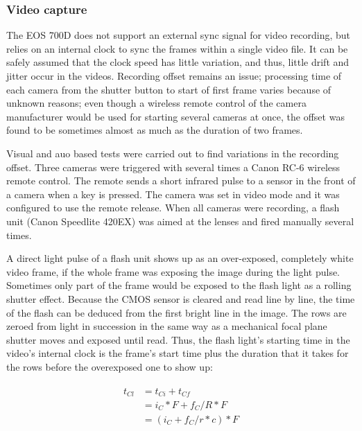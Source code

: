 \subsubsection{Video capture}


The EOS 700D does not support an external sync signal for video recording, but relies on an internal clock to sync the frames within a single video file.
It can be safely assumed that the clock speed has little variation, and thus, little drift and jitter occur in the videos.
Recording offset remains an issue;
processing time of each camera from the shutter button to start of first frame varies because of unknown reasons; even though a wireless remote control of the camera manufacturer would be used for starting several cameras at once, the offset was found to be sometimes almost as much as the duration of two frames.


Visual and auo based tests were carried out to find variations in the recording offset.
Three cameras were triggered with several times a Canon RC-6 wireless remote control.
The remote sends a short infrared pulse to a sensor in the front of a camera when a key is pressed.
The camera was set in video mode and it was configured to use the remote release.
When all cameras were recording, a flash unit (Canon Speedlite 420EX) was aimed at the lenses and fired manually several times.


A direct light pulse of a flash unit shows up as an over-exposed, completely white video frame, if the whole frame was exposing the image during the light pulse.
Sometimes only part of the frame would be exposed to the flash light as a rolling shutter effect.
Because the CMOS sensor is cleared and read line by line, the time of the flash can be deduced from the first bright line in the image.
The rows are zeroed from light in succession in the same way as a mechanical focal plane shutter moves and exposed until read.
Thus, the flash light's starting time in the video's internal clock is the frame's start time plus the duration that it takes for the rows before the overexposed one to show up:

\begin{align} \begin{split} \label{timingcalib}
t_{Cl} &= t_{Ci} + t_{Cf} \\
&= i_C * F + f_C / R * F \\
&= (i_C + f_C / r * c) * F
\end{split} \end{align}

